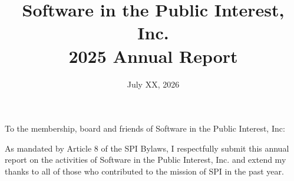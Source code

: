 \documentclass[a4paper]{report}
\begin{document}
\title{Software in the Public Interest, Inc.\\
2025 Annual Report}
\date{July XX, 2026}

\maketitle

\newpage


\hspace{1em}

To the membership, board and friends of Software in the Public Interest, Inc:

As mandated by Article 8 of the SPI Bylaws, I respectfully submit this annual report on the activities of Software in the Public Interest, Inc. and extend my thanks to all of those who contributed to the mission of SPI in the past year.
\end{document}
